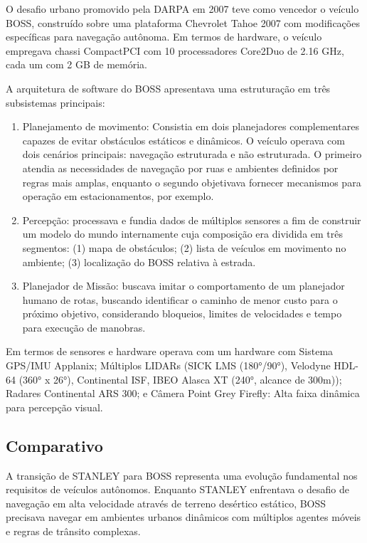 O desafio urbano promovido pela DARPA em 2007 teve como vencedor o veículo BOSS, construído sobre uma plataforma Chevrolet Tahoe 2007 com modificações específicas para navegação autônoma. Em termos de hardware, o veículo empregava chassi CompactPCI com 10 processadores Core2Duo de 2.16 GHz, cada um com 2 GB de memória.

A arquitetura de software do BOSS apresentava uma estruturação em três subsistemas principais:
\begin{enumerate}
    \item Planejamento de movimento: Consistia em dois planejadores complementares capazes de evitar obstáculos estáticos e dinâmicos. O veículo operava com dois cenários principais: navegação estruturada e não estruturada. O primeiro atendia as necessidades de navegação por ruas e ambientes definidos por regras mais amplas, enquanto o segundo objetivava fornecer mecanismos para operação em estacionamentos, por exemplo.
    \item Percepção: processava e fundia dados de múltiplos sensores a fim de construir um modelo do mundo internamente cuja composição era dividida em três segmentos: (1) mapa de obstáculos; (2) lista de veículos em movimento no ambiente; (3) localização do BOSS relativa à estrada.
    \item Planejador de Missão: buscava imitar o comportamento de um planejador humano de rotas, buscando identificar o caminho de menor custo para o próximo objetivo, considerando bloqueios, limites de velocidades e tempo para execução de manobras.
\end{enumerate}

Em termos de sensores e hardware operava com um hardware com Sistema GPS/IMU Applanix; Múltiplos LIDARs (SICK LMS (180°/90°), Velodyne HDL-64 (360° x 26°), Continental ISF, IBEO Alasca XT (240°, alcance de 300m)); Radares Continental ARS 300; e Câmera Point Grey Firefly: Alta faixa dinâmica para percepção visual. 

\subsection{Comparativo}

A transição de STANLEY para BOSS representa uma evolução fundamental nos requisitos de veículos autônomos. Enquanto STANLEY enfrentava o desafio de navegação em alta velocidade através de terreno desértico estático, BOSS precisava navegar em ambientes urbanos dinâmicos com múltiplos agentes móveis e regras de trânsito complexas.

